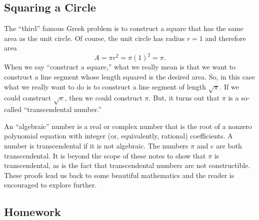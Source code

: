 \documentclass[11pt]{article}
\theoremstyle{definition}
\begin{document}
\subsection{Squaring a Circle}

The ``third'' famous Greek problem is to construct a square that has the same area as the unit circle. Of course, the unit circle has radius $r=1$ and therefore
area 
\[ A = \pi r^2 = \pi(1)^2 = \pi.\]
When we say ``construct a square,'' what we really mean is that we want to construct a line segment whose length squared is the desired area. So, in this case
what we really want to do is to construct a line segment of length $\sqrt{\pi}$. If we could construct $\sqrt{\pi}$, then we could construct $\pi$. But,
it turns out that $\pi$ is a so-called ``transcendental number.'' 

An ``algebraic'' number is a real or complex number that is the root of a nonzero polynomial equation with integer (or, equivalently, rational) coefficients. 
A number is transcendental if it is not algebraic. The numbers $\pi$ and $e$ are both transcendental. It is beyond the scope of these notes to 
show that $\pi$ is transcendental, as is the fact that transcendental numbers are not constructible. These proofs lead us back to some beautiful 
mathematics and the reader is encouraged to explore further.

\newpage\subsection{Homework}
\end{document}
